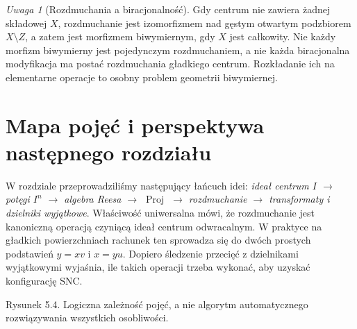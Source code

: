 \documentclass[11pt,a4paper,openany]{report}
\numberwithin{equation}{section}
\theoremstyle{plain}
\theoremstyle{definition}
\theoremstyle{remark}
\newtheorem{uwaga}[twierdzenie]{Uwaga}
\newcommand{\V}{\operatorname V}
\begin{document}
\begin{uwaga}[Rozdmuchania a biracjonalność]
Gdy centrum nie zawiera żadnej składowej $X$, rozdmuchanie
jest izomorfizmem nad gęstym otwartym podzbiorem
$X\setminus Z$, a zatem jest morfizmem biwymiernym,
gdy $X$ jest całkowity. Nie każdy morfizm biwymierny
jest pojedynczym rozdmuchaniem, a nie każda
biracjonalna modyfikacja ma postać rozdmuchania
gładkiego centrum. Rozkładanie ich na elementarne
operacje to osobny problem geometrii biwymiernej.
\end{uwaga}

\section{Mapa pojęć i perspektywa następnego rozdziału}
\label{sec:ga5-outlook}

W rozdziale przeprowadziliśmy następujący łańcuch idei:
\emph{ideał centrum $I$ $\longrightarrow$ potęgi $I^n$
$\longrightarrow$ algebra Reesa $\longrightarrow$
$\operatorname{Proj}$ $\longrightarrow$ rozdmuchanie
$\longrightarrow$ transformaty i dzielniki wyjątkowe}.
Właściwość uniwersalna mówi, że rozdmuchanie jest
kanoniczną operacją czyniącą ideał centrum odwracalnym.
W praktyce na gładkich powierzchniach rachunek ten
sprowadza się do dwóch prostych podstawień
$y=xv$ i $x=yu$. Dopiero śledzenie przecięć
z dzielnikami wyjątkowymi wyjaśnia, ile takich operacji
trzeba wykonać, aby uzyskać konfigurację SNC.

\begin{center}
\begin{minipage}{\linewidth}
\centering
{}

{\small Rysunek 5.4. Logiczna zależność pojęć, a nie algorytm automatycznego rozwiązywania wszystkich osobliwości.}\par
\end{minipage}
\end{center}
\end{document}
